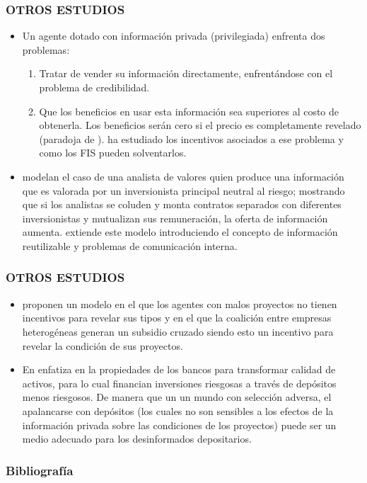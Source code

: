 \documentclass[10pt, xcolor=table, x11names]{beamer}
\begin{document}
\begin{frame}
    \frametitle{{\normalsize OTROS ESTUDIOS} {}}
     \begin{itemize}
         \item  Un agente dotado con información privada (privilegiada) enfrenta dos problemas: 
         \begin{enumerate}
             \item Tratar de vender su información directamente, enfrentándose con el problema de credibilidad.
             \item Que los beneficios en usar esta información sea superiores al costo de obtenerla. Los beneficios serán cero si el precio es completamente revelado (paradoja de \cite{Grossman1980}). \cite{Campbell1980} ha estudiado los incentivos asociados a ese problema y como los FIS pueden solventarlos.
         \end{enumerate}
     \item \cite{Remark1984} modelan el caso de una analista de valores quien produce una información que es valorada por un inversionista principal neutral al riesgo; mostrando que si los analistas se coluden y monta contratos separados con diferentes inversionistas y mutualizan sus remuneración, la oferta de información aumenta. \cite{Millon1985} extiende este modelo introduciendo el concepto de información reutilizable y problemas de comunicación interna.  
     \end{itemize}
   
\end{frame}

\begin{frame}
    \frametitle{{\normalsize OTROS ESTUDIOS} {}}
    \begin{itemize}
        \item \cite{Prescott1986} proponen un modelo en el que los agentes con malos proyectos no tienen incentivos para revelar sus tipos y en el que la coalición entre empresas heterogéneas generan un subsidio cruzado siendo esto un incentivo para revelar la condición de sus proyectos. 
        \item En \cite{Gorton1990} enfatiza en la propiedades de los bancos para transformar calidad de activos, para lo cual financian inversiones riesgosas a través de depósitos menos riesgosos. De manera que un un mundo con selección adversa, el apalancarse con depósitos (los cuales no son sensibles a los efectos de la información privada sobre las condiciones de los proyectos) puede ser un medio adecuado para los desinformados depositarios.
    \end{itemize}
    
\end{frame}


	\begin{frame}[allowframebreaks]
    \frametitle{{\large 
            Bibliografía}}
    \renewcommand{\refname}{Referencias}
    
    
\end{frame}
\end{document}
